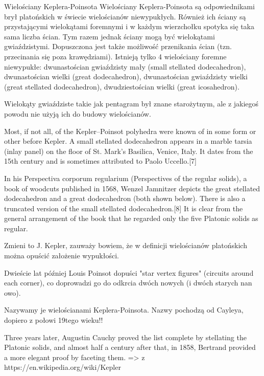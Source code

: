 

Wielościany Keplera-Poinsota
Wielościany Keplera-Poinsota są odpowiednikami brył platońskich w świecie wielościanów niewypukłych. Również ich ściany są przystającymi wielokątami foremnymi i w każdym wierzchołku spotyka się taka sama liczba ścian. Tym razem jednak ściany mogą być wielokątami gwiaździstymi. Dopuszczona jest także możliwość przenikania ścian (tzn. przecinania się poza krawędziami).
Istnieją tylko 4 wielościany foremne niewypukłe:
dwunastościan gwiaździsty mały (small stellated dodecahedron),
dwunastościan wielki (great dodecahedron),
dwunastościan gwiaździsty wielki (great stellated dodecahedron),
dwudziestościan wielki (great icosahedron). 

Wielokąty gwiaździste takie jak pentagram był znane starożytnym, ale z jakiegoś powodu nie użyją ich do budowy wielościanów.

Most, if not all, of the Kepler–Poinsot polyhedra were known of in some form or other before Kepler. A small stellated dodecahedron appears in a marble tarsia (inlay panel) on the floor of St. Mark's Basilica, Venice, Italy. It dates from the 15th century and is sometimes attributed to Paolo Uccello.[7]

In his Perspectiva corporum regularium (Perspectives of the regular solids), a book of woodcuts published in 1568, Wenzel Jamnitzer depicts the great stellated dodecahedron and a great dodecahedron (both shown below). There is also a truncated version of the small stellated dodecahedron.[8] It is clear from the general arrangement of the book that he regarded only the five Platonic solids as regular.

Zmieni to J. Kepler, zauważy bowiem, że w definicji wielościanów platońskich można opuścić założenie wypukłości.

Dwieście lat później Louis Poinsot dopuści "star vertex figures" (circuits around each corner), co doprowadzi go do odkrcia dwóch nowych (i dwóch starych nan owo).

Nazywamy je wielościanami Keplera-Poinsota. Nazwy pochodzą od Cayleya, dopiero z połowi 19tego wieku!!

Three years later, Augustin Cauchy proved the list complete by stellating the Platonic solids, and almost half a century after that, in 1858, Bertrand provided a more elegant proof by faceting them. => z https://en.wikipedia.org/wiki/Kepler%

